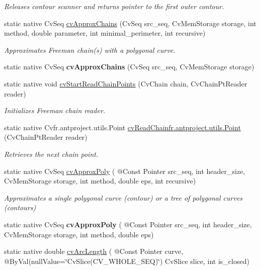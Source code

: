 \begin{DoxyCompactItemize}
\begin{DoxyCompactList}\small\item\em Releases contour scanner and returns pointer to the first outer contour. \end{DoxyCompactList}\item 
static native Cv\+Seq \hyperlink{group__imgproc__c_ga5c874856009b84fc0c3a9533f957516c}{cv\+Approx\+Chains} (Cv\+Seq src\+\_\+seq, Cv\+Mem\+Storage storage, int method, double parameter, int minimal\+\_\+perimeter, int recursive)
\begin{DoxyCompactList}\small\item\em Approximates Freeman chain(s) with a polygonal curve. \end{DoxyCompactList}\item 
static native Cv\+Seq {\bfseries cv\+Approx\+Chains} (Cv\+Seq src\+\_\+seq, Cv\+Mem\+Storage storage)
\item 
static native void \hyperlink{group__imgproc__c_gab6502128f5100580662a79a7326e50e0}{cv\+Start\+Read\+Chain\+Points} (Cv\+Chain chain, Cv\+Chain\+Pt\+Reader reader)
\begin{DoxyCompactList}\small\item\em Initializes Freeman chain reader. \end{DoxyCompactList}\item 
static native Cv\+fr.antproject.utils.Point \hyperlink{group__imgproc__c_ga60ca24d0d962737958150406351d91c7}{cv\+Read\+Chain\+fr.antproject.utils.Point} (Cv\+Chain\+Pt\+Reader reader)
\begin{DoxyCompactList}\small\item\em Retrieves the next chain point. \end{DoxyCompactList}\item 
static native Cv\+Seq \hyperlink{group__imgproc__c_ga04330d92548cde6503b33785252af580}{cv\+Approx\+Poly} ( @Const Pointer src\+\_\+seq, int header\+\_\+size, Cv\+Mem\+Storage storage, int method, double eps, int recursive)
\begin{DoxyCompactList}\small\item\em Approximates a single polygonal curve (contour) or a tree of polygonal curves (contours) \end{DoxyCompactList}\item 
static native Cv\+Seq {\bfseries cv\+Approx\+Poly} ( @Const Pointer src\+\_\+seq, int header\+\_\+size, Cv\+Mem\+Storage storage, int method, double eps)
\item 
static native double \hyperlink{group__imgproc__c_gaf095420cca062536116edaad5f0391ae}{cv\+Arc\+Length} ( @Const Pointer curve, @By\+Val(null\+Value=\char`\"{}Cv\+Slice(C\+V\+\_\+\+W\+H\+O\+L\+E\+\_\+\+S\+EQ)\char`\"{}) Cv\+Slice slice, int is\+\_\+closed)

\end{DoxyCompactItemize}
